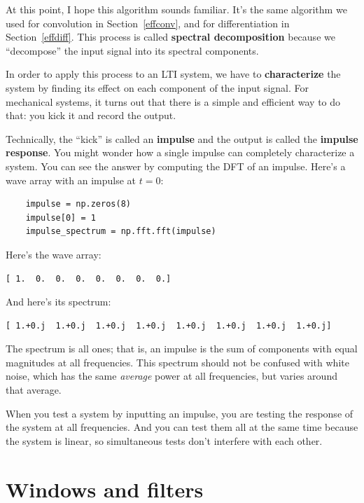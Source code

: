 \documentclass[12pt]{book}
\begin{document}
At this point, I hope this algorithm sounds familiar.  It's the
same algorithm we used for convolution in Section~\ref{effconv}, and
for differentiation in Section~\ref{effdiff}.  This process
is called {\bf spectral decomposition} because we ``decompose''
the input signal into its spectral components.

In order to apply this process to an LTI system, we have to {\bf
  characterize} the system by finding its effect on each component
of the input signal.  For mechanical systems, it turns out that there
is a simple and efficient way to do that: you kick it and record
the output.

Technically, the ``kick'' is called an {\bf impulse} and the
output is called the {\bf impulse response}.  You might wonder
how a single impulse can completely characterize a system.  You
can see the answer by computing the DFT of an impulse.  Here's
a wave array with an impulse at $t=0$:

\begin{verbatim}
    impulse = np.zeros(8)
    impulse[0] = 1
    impulse_spectrum = np.fft.fft(impulse)
\end{verbatim}

Here's the wave array:

\begin{verbatim}
[ 1.  0.  0.  0.  0.  0.  0.  0.]
\end{verbatim}

And here's its spectrum:

\begin{verbatim}
[ 1.+0.j  1.+0.j  1.+0.j  1.+0.j  1.+0.j  1.+0.j  1.+0.j  1.+0.j]
\end{verbatim}

The spectrum is all ones; that is, an impulse is the sum of components
with equal magnitudes at all frequencies.  This
spectrum should not be confused with white noise, which has the same
{\em average} power at all frequencies, but varies around that
average.

When you test a system by inputting
an impulse, you are testing the response of the
system at all frequencies.  And you can test them all at the same
time because the system is linear, so simultaneous tests don't
interfere with each other.


\section{Windows and filters}
\label{winfilt}
\end{document}
